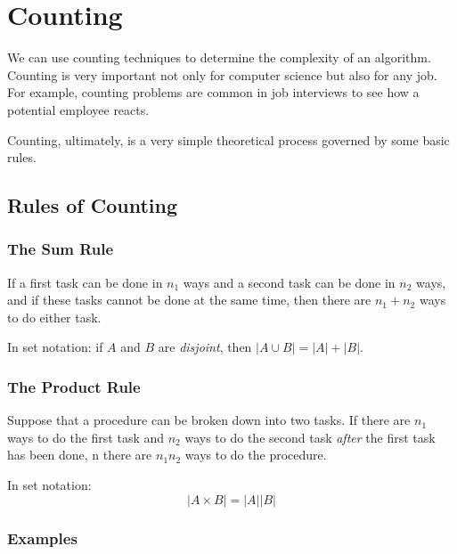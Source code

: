 \chapter{Counting}

We can use counting techniques to determine the complexity of an algorithm.
Counting is very important not only for computer science but also for any job.
For example, counting problems are common in job interviews to see how a potential employee reacts.

Counting, ultimately, is a very simple theoretical process governed by some basic rules.

\section{Rules of Counting}

\subsection{The Sum Rule}
  If a first task can be done in \(n_1\) ways and a second task can be done in \(n_2\) ways,
  and if these tasks cannot be done at the same time, then there are \(n_1+n_2\) ways to do either task.

  In set notation: if \(A\) and \(B\) are \emph{disjoint}, then \(|A \cup B|=|A|+|B|\).

\subsection{The Product Rule}

Suppose that a procedure can be broken down into two tasks.
If there are \(n_1\) ways to do the first task and 
\(n_2\) ways to do the second task
\emph{after} the first task has been done,
n there are \(n_1n_2\) ways to do the procedure.

In set notation:
\[|A \times B| = |A||B| \]

\subsection{Examples}


